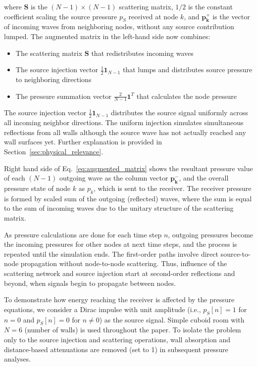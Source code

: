 \documentclass[journal]{IEEEtran}
\begin{document}
where $\mathbf{S}$ is the $(N-1) \times (N-1)$ scattering matrix,  $1/2$ is the constant coefficient scaling the source pressure $p_{S}$ received at node $k$, and $\mathbf{p_k^+}$ is the vector of incoming waves from neighboring nodes, without any source contribution lumped. The augmented matrix in the left-hand side now combines:
\begin{itemize}
    \item The scattering matrix $\mathbf{S}$ that redistributes incoming waves
    \item The source injection vector $\frac{1}{2}\mathbf{1}_{N-1}$ that lumps and distributes source pressure to neighboring directions
    \item The pressure summation vector $\frac{2}{N-1}\mathbf{1}^T$ that calculates the node pressure
\end{itemize}

The source injection vector $\frac{1}{2}\mathbf{1}_{N-1}$ distributes the source signal uniformly across all incoming neighbor directions. The uniform injection simulates simultaneous reflections from all walls although the source wave has not actually reached any wall surfaces yet. Further explanation is provided in Section~\ref{sec:physical_relevance}.

Right hand side of Eq.~\ref{eq:augmented_matrix} shows the resultant pressure value of each $(N-1)$ outgoing wave as the column vector $\mathbf{p_k^-}$, and the overall pressure state of node $k$ as $p_k$, which is sent to the receiver. 
The receiver pressure is formed by scaled sum of the outgoing (reflected) waves, where the sum is equal to the sum of incoming waves due to the unitary structure of the scattering matrix. 

As pressure calculations are done for each time step $n$, outgoing pressures become the incoming pressures for other nodes at next time steps, and the process is repeated until the simulation ends. 
The first-order paths involve direct source-to-node propagation without node-to-node scattering.
Thus, influence of the scattering network and source injection start at second-order reflections and beyond, when signals begin to propagate between nodes.

To demonstrate how energy reaching the receiver is affected by the pressure equations, we consider a Dirac impulse with unit amplitude (i.e., $p_{S}[n] = 1$ for $n = 0$ and $p_{S}[n] = 0$ for $n \neq 0$) as the source signal. Simple cuboid room with $N=6$ (number of walls) is used throughout the paper. To isolate the problem only to the source injection and scattering operations, wall absorption and distance-based attenuations are removed (set to 1) in subsequent pressure analyses.
\end{document}
